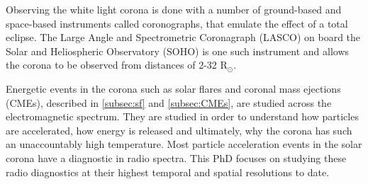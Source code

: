 Observing the white light corona is done with a number of ground-based and space-based instruments called coronographs, that emulate the effect of a total eclipse. The Large Angle and Spectrometric Coronagraph (LASCO) on board the Solar and Heliospheric Observatory (SOHO) is one such instrument and allows the corona to be observed from distances of 2-32 R$_\odot$. %

Energetic events in the corona such as solar flares and coronal mass ejections (CMEs), described in \ref{subsec:sf} and \ref{subsec:CMEs}, are studied across the electromagnetic spectrum. They are studied in order to understand how particles are accelerated, how energy is released and ultimately, why the corona has such an unaccountably high temperature.
Most particle acceleration events in the solar corona have a diagnostic in radio spectra. This PhD focuses on studying these radio diagnostics at their highest temporal and spatial resolutions to date.



